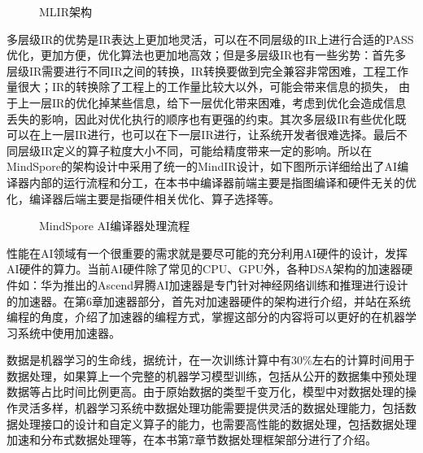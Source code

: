 \documentclass[letterpaper,10pt,english]{sphinxmanual}
\begin{document}
\begin{figure}[H]
\centering
\capstart

\noindent{}
\caption{MLIR架构}\label{\detokenize{chapter_preface_advanced/index:id5}}\end{figure}

\sphinxAtStartPar
​
多层级IR的优势是IR表达上更加地灵活，可以在不同层级的IR上进行合适的PASS优化，更加方便，优化算法也更加地高效；但是多层级IR也有一些劣势：首先多层级IR需要进行不同IR之间的转换，IR转换要做到完全兼容非常困难，工程工作量很大；IR的转换除了工程上的工作量比较大以外，可能会带来信息的损失，
由于上一层IR的优化掉某些信息，给下一层优化带来困难，考虑到优化会造成信息丢失的影响，因此对优化执行的顺序也有更强的约束。其次多层级IR有些优化既可以在上一层IR进行，也可以在下一层IR进行，让系统开发者很难选择。最后不同层级IR定义的算子粒度大小不同，可能给精度带来一定的影响。所以在MindSpore的架构设计中采用了统一的MindIR设计，如下图所示详细给出了AI编译器内部的运行流程和分工，在本书中编译器前端主要是指图编译和硬件无关的优化，编译器后端主要是指硬件相关优化、算子选择等。

\begin{figure}[H]
\centering
\capstart

\noindent{}
\caption{MindSpore AI编译器处理流程}\label{\detokenize{chapter_preface_advanced/index:id6}}\end{figure}

\sphinxAtStartPar
​
性能在AI领域有一个很重要的需求就是要尽可能的充分利用AI硬件的设计，发挥AI硬件的算力。当前AI硬件除了常见的CPU、GPU外，各种DSA架构的加速器硬件如：华为推出的Ascend昇腾AI加速器是专门针对神经网络训练和推理进行设计的加速器。在第6章加速器部分，首先对加速器硬件的架构进行介绍，并站在系统编程的角度，介绍了加速器的编程方式，掌握这部分的内容将可以更好的在机器学习系统中使用加速器。

\sphinxAtStartPar
数据是机器学习的生命线，据统计，在一次训练计算中有30\%左右的计算时间用于数据处理，如果算上一个完整的机器学习模型训练，包括从公开的数据集中预处理数据等占比时间比例更高。由于原始数据的类型千变万化，模型中对数据处理的操作灵活多样，机器学习系统中数据处理功能需要提供灵活的数据处理能力，包括数据处理接口的设计和自定义算子的能力，也需要高性能的数据处理，包括数据处理加速和分布式数据处理等，在本书第7章节数据处理框架部分进行了介绍。
\end{document}
